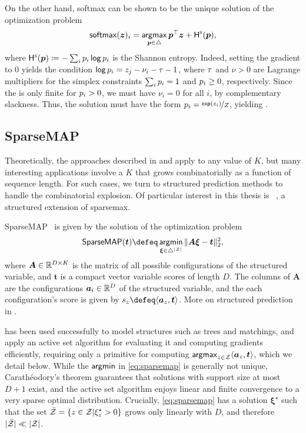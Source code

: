 On the other hand, softmax can be shown to be the unique solution of the optimization problem
\begin{equation}
    \operatorname*{\mathsf{softmax}}(\bm{z})_i =
    \operatorname*{\mathsf{argmax}}_{\bm{p} \in \triangle} \bm{p}^\top\bm{z} + \mathsf{H}^{\textsc{s}}(\bm{p}),
\end{equation}
where $\mathsf{H}^{\textsc{s}}(\bm{p}) \coloneqq -\sum_i p_i \operatorname*{\mathsf{log}} p_i$ is the Shannon entropy.
Indeed, setting the gradient to $0$ yields the condition
$\operatorname*{\mathsf{log}} p_i = z_j - \nu_i - \tau - 1$, where $\tau$ and $\nu > 0$ are Lagrange
multipliers for the simplex constraints $\sum_i p_i = 1$ and $p_i \geq 0$,
respectively. Since the \lhs is only finite for $p_i>0$,
we must have $\nu_i=0$ for all $i$, by complementary
slackness. Thus, the solution must have the form $p_i =
    \nicefrac{\operatorname*{\mathsf{exp}}(z_i)}{Z}$, yielding .

\subsection{SparseMAP}\label{sec:smap_bg}

\noindent Theoretically, the approaches described in
 and  apply to any
value of $K$, but many interesting
applications involve a $K$ that grows combinatorially as a function
of sequence length. For such cases, we turn to structured prediction
methods to handle the combinatorial explosion. Of particular interest
in this thesis is \smap~\citep{niculae2018sparsemap, sparsemapcg}, a
structured extension of sparsemax.

\begin{definition}[SparseMAP]
    SparseMAP~\citep{niculae2018sparsemap,
        sparsemapcg} is given by the solution of the optimization problem
    \begin{equation}\label{eq:sparsemap}
        \smapop(\bm{t}) \defeq \argmin_{\pv \in \simplex^{|\ZZ|}}
        \|\bm{A}\pv - \bm{t}\|_2^2,
    \end{equation}
    where $\bm{A}\in\mathbb{R}^{D\times K}$ is the matrix of all possible configurations
    of the structured variable, and $\bm{t}$ is a compact vector variable scores of length $D$.
    The columns of $\bm{A}$ are the configurations $\bm{a}_i \in \mathbb{R}^D$ of the structured variable,
    and the each configuration's score is given by $s_z \defeq \DP{\bm{a}_z}{\bm{t}}$.
    More on structured prediction in .
\end{definition}

\smap has been used successfully to model structures such as trees
and matchings, and \citet{niculae2018sparsemap} apply an active set
algorithm for evaluating it and computing gradients efficiently,
requiring only a primitive for computing $\operatorname*{\mathsf{argmax}}_{z \in \mathcal{Z}} \langle
    \bm{a}_z, \bm{t}\rangle$, which we detail below. While the
$\operatorname*{\mathsf{argmin}}$ in \eqref{eq:sparsemap} is generally not unique,
Carath\'eodory's theorem guarantees that solutions with support size
at most $D+1$ exist, and the active set algorithm enjoys linear and
finite convergence to a very sparse optimal distribution. Crucially,
\eqref{eq:sparsemap} has a solution $\bm{\xi}^\star$ such that the
set $\bar{\mathcal{Z}} = \left\{z \in \mathcal{Z} |\xi^\star_z > 0\right\}$ grows
only linearly with $D$, and therefore $|\bar{\mathcal{Z}}| \ll |\mathcal{Z}|$.

